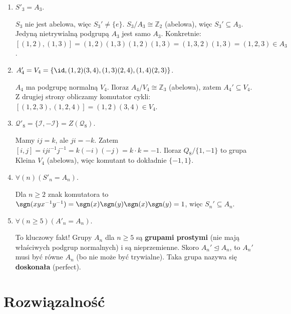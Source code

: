 \begin{enumerate}[label=\arabic*)]
	\item $S'_{3} = A_3$.
	\begin{proposition}
		$S_3$ nie jest abelowa, więc $S_3' \neq \{e\}$. $S_3/A_3 \cong \mathbb{Z}_2$ (abelowa), więc $S_3' \subseteq A_3$. Jedyną nietrywialną podgrupą $A_3$ jest samo $A_3$.
		Konkretnie: $[(1,2), (1,3)] = (1,2)(1,3)(1,2)(1,3) = (1,3,2)(1,3) = (1,2,3) \in A_3$.
	\end{proposition}

	\item $A'_{4} = V_4 = \{\id, (1,2)(3,4), (1,3)(2,4), (1,4)(2,3)\} $.
	\begin{proposition}
		$A_4$ ma podgrupę normalną $V_4$. Iloraz $A_4/V_4 \cong \mathbb{Z}_3$ (abelowa), zatem $A_4' \subseteq V_4$.
		Z drugiej strony obliczamy komutator cykli: $[(1,2,3), (1,2,4)] = (1,2)(3,4) \in V_4$.
	\end{proposition}

	\item $\mathcal{Q}'_{8} = \{\mathcal{I}, -\mathcal{I}\} = Z(\mathcal{Q}_8)$.
	\begin{proposition}
		Mamy $ij = k$, ale $ji = -k$. Zatem $[i,j] = iji^{-1}j^{-1} = k(-i)(-j) = k \cdot k = -1$.
		Iloraz $Q_8 / \{1, -1\}$ to grupa Kleina $V_4$ (abelowa), więc komutant to dokładnie $\{-1, 1\}$.
	\end{proposition}

	\item $\forall\left( n \right)\left( S'_{n} = A_{n} \right)$.
	\begin{proposition}
		Dla $n \ge 2$ znak komutatora to $\sgn(xyx^{-1}y^{-1}) = \sgn(x)\sgn(y)\sgn(x)\sgn(y) = 1$, więc $S_n' \subseteq A_n$.
	\end{proposition}

	\item $\forall\left( n \ge 5 \right) \left( A'_{n} = A_{n} \right)$.
	\begin{proposition}
		To kluczowy fakt! Grupy $A_n$ dla $n \ge 5$ są \textbf{grupami prostymi} (nie mają właściwych podgrup normalnych) i są nieprzemienne.
		Skoro $A_n' \unlhd A_n$, to $A_n'$ musi być równe $A_n$ (bo nie może być trywialne).
		Taka grupa nazywa się \textbf{doskonała} (perfect).
	\end{proposition}
\end{enumerate}

\section{Rozwiązalność}

